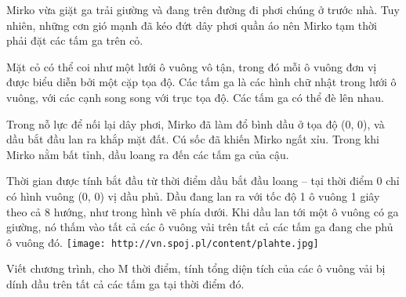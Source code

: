 Mirko vừa giặt ga trải giường và đang trên đường đi phơi chúng ở trước nhà. Tuy nhiên, những cơn gió mạnh đã kéo đứt dây phơi quần áo nên Mirko tạm thời phải đặt các tấm ga trên cỏ.  

   Mặt cỏ có thể coi như một lưới ô vuông vô tận, trong đó mỗi ô vuông đơn vị được biểu diễn bởi một cặp tọa độ. Các tấm ga là các hình chữ nhật trong lưới ô vuông, với các cạnh song song với trục tọa độ. Các tấm ga có thể đè lên nhau.  

   Trong nỗ lực để nối lại dây phơi, Mirko đã làm đổ bình dầu ở tọa độ (0, 0), và dầu bắt đầu lan ra khắp mặt đất. Cú sốc đã khiến Mirko ngất xỉu. Trong khi Mirko nằm bất tỉnh, dầu loang ra đến các tấm ga của cậu.  

   Thời gian được tính bắt đầu từ thời điểm dầu bắt đầu loang – tại thời điểm 0 chỉ có hình vuông (0, 0) vị dầu phủ. Dầu đang lan ra với tốc độ 1 ô vuông 1 giây theo cả 8 hướng, như trong hình vẽ phía dưới. Khi dầu lan tới một ô vuông có ga giường, nó thấm vào tất cả các ô vuông vải trên tất cả các tấm ga đang che phủ ô vuông đó.  
\texttt{[image: http://vn.spoj.pl/content/plahte.jpg]}

   Viết chương trình, cho M thời điểm, tính tổng diện tích của các ô vuông vải bị dính dầu trên tất cả các tấm ga tại thời điểm đó.  

\